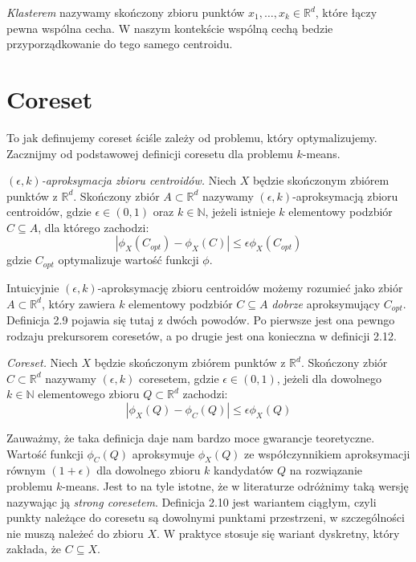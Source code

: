 \begin{definition}
    \emph{Klasterem} nazywamy skończony zbioru punktów $x_{1}, \dots, x_{k} \in \mathbb{R}^{d}$, które łączy pewna wspólna cecha.
    W naszym kontekście wspólną cechą bedzie przyporządkowanie do tego samego centroidu.
\end{definition}

\section{Coreset}

To jak definujemy coreset ściśle zależy od problemu, który optymalizujemy.
Zacznijmy od podstawowej definicji coresetu dla problemu $k$-means.

\begin{definition}
    \emph{$(\epsilon, k)$-aproksymacja zbioru centroidów.} 
    Niech $X$ będzie skończonym zbiórem punktów z $\mathbb{R}^{d}$.
    Skończony zbiór $A \subset \mathbb{R}^{d}$ nazywamy $(\epsilon, k)$-aproksymacją zbioru centroidów, gdzie $\epsilon \in (0, 1)$ oraz $k \in \mathbb{N}$, jeżeli istnieje $k$ elementowy podzbiór $C \subseteq A$, dla którego zachodzi:
    \begin{equation}
        |\phi_{X}(C_{opt}) - \phi_{X}(C)| \leq \epsilon\phi_{X}(C_{opt})
    \end{equation}
    gdzie $C_{opt}$ optymalizuje wartość funkcji $\phi$.
\end{definition}

\noindent
Intuicyjnie $(\epsilon, k)$-aproksymację zbioru centroidów możemy rozumieć jako zbiór $A \subset \mathbb{R}^{d}$, który zawiera $k$ elementowy podzbiór $C \subseteq A$ \textit{dobrze} aproksymujący $C_{opt}$.
Definicja 2.9 pojawia się tutaj z dwóch powodów.
Po pierwsze jest ona pewngo rodzaju prekursorem coresetów, a po drugie jest ona konieczna w definicji 2.12.

\begin{definition}
    \emph{Coreset.} Niech $X$ będzie skończonym zbiórem punktów z $\mathbb{R}^{d}$.
    Skończony zbiór $C \subset \mathbb{R}^{d}$ nazywamy $(\epsilon, k)$ coresetem, gdzie $\epsilon \in (0, 1)$, jeżeli dla dowolnego $k \in \mathbb{N}$ elementowego zbioru $Q \subset \mathbb{R}^{d}$ zachodzi:
    \begin{equation}
        |\phi_{X}(Q) - \phi_{C}(Q)| \leq \epsilon\phi_{X}(Q)
    \end{equation}
\end{definition}

\noindent
Zauważmy, że taka definicja daje nam bardzo moce gwarancje teoretyczne.
Wartość funkcji $\phi_{C}(Q)$ aproksymuje $\phi_{X}(Q)$ ze współczynnikiem aproksymacji równym $(1+\epsilon)$ dla dowolnego zbioru $k$ kandydatów $Q$ na rozwiązanie problemu $k$-means.
Jest to na tyle istotne, że w literaturze odróżnimy taką wersję nazywając ją \textit{strong coresetem}.
Definicja 2.10 jest wariantem ciągłym, czyli punkty należące do coresetu są dowolnymi punktami przestrzeni, w szczególności nie muszą należeć do zbioru $X$.
W praktyce stosuje się wariant dyskretny, który zakłada, że $C \subseteq X$.

